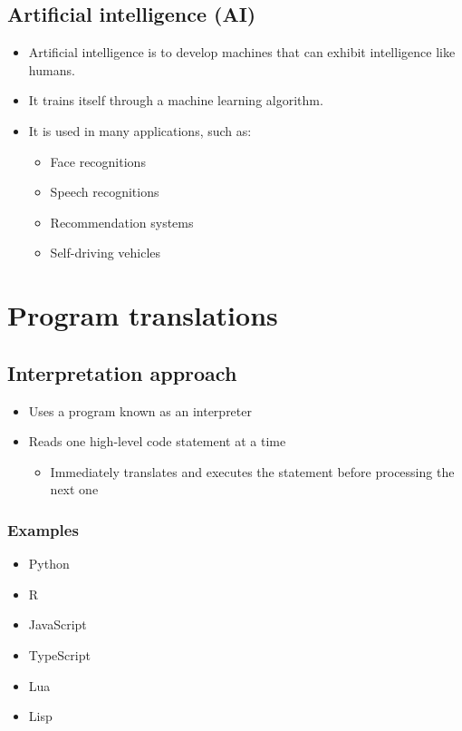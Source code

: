 \documentclass[11pt]{article}
\begin{document}
\subsection{Artificial intelligence (AI)}
\label{sec:orge6b9d1b}
\begin{itemize}
\item Artificial intelligence is to develop machines that can exhibit intelligence like humans.
\item It trains itself through a machine learning algorithm.
\item It is used in many applications, such as:
\begin{itemize}
\item Face recognitions
\item Speech recognitions
\item Recommendation systems
\item Self-driving vehicles
\end{itemize}
\end{itemize}


 \newpage
\section{Program translations}
\label{sec:org09c8c74}

\subsection{Interpretation approach}
\label{sec:org2d5769b}
\begin{itemize}
\item Uses a program known as an interpreter
\item Reads one high-level code statement at a time
\begin{itemize}
\item Immediately translates and executes the statement before processing the next one
\end{itemize}
\end{itemize}
\subsubsection{Examples}
\label{sec:org2a43f8e}
\begin{itemize}
\item Python
\item R
\item JavaScript
\item TypeScript
\item Lua
\item Lisp
\end{itemize}
\end{document}
